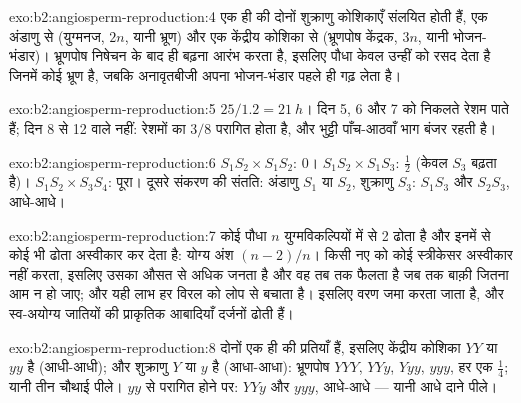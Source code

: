 \begin{solution}{exo:b2:angiosperm-reproduction:4}
एक ही  की दोनों शुक्राणु कोशिकाएँ संलयित होती हैं, एक
अंडाणु से (युग्मनज, $2n$, यानी भ्रूण) और एक केंद्रीय कोशिका से (भ्रूणपोष
केंद्रक, $3n$, यानी भोजन-भंडार)। भ्रूणपोष निषेचन के बाद ही बढ़ना आरंभ
करता है, इसलिए पौधा केवल उन्हीं  को रसद देता है जिनमें कोई
भ्रूण है, जबकि अनावृतबीजी अपना भोजन-भंडार पहले ही गढ़ लेता है।
\end{solution}

\begin{solution}{exo:b2:angiosperm-reproduction:5}
$25/1.2 = \qty{21}{h}$। दिन 5, 6 और 7 को निकलते रेशम  पाते हैं;
दिन 8 से 12 वाले नहीं: रेशमों का $3/8$ परागित होता है, और
भुट्टी पाँच-आठवाँ भाग बंजर रहती है।
\end{solution}

\begin{solution}{exo:b2:angiosperm-reproduction:6}
$S_1S_2\times S_1S_2$: 0। $S_1S_2\times S_1S_3$: $\tfrac12$ (केवल $S_3$
 बढ़ता है)। $S_1S_2\times S_3S_4$: पूरा। दूसरे संकरण की संतति:
अंडाणु $S_1$ या $S_2$, शुक्राणु $S_3$: $S_1S_3$ और $S_2S_3$, आधे-आधे।
\end{solution}

\begin{solution}{exo:b2:angiosperm-reproduction:7}
कोई पौधा $n$ युग्मविकल्पियों में से 2 ढोता है और इनमें से कोई भी ढोता
 अस्वीकार कर देता है: योग्य अंश $(n - 2)/n$। किसी नए  को
कोई स्त्रीकेसर अस्वीकार नहीं करता, इसलिए उसका  औसत से अधिक  जनता
है और वह तब तक फैलता है जब तक बाक़ी जितना आम न हो जाए; और यही लाभ हर
विरल  को लोप से बचाता है। इसलिए वरण  जमा करता
जाता है, और स्व-अयोग्य जातियों की प्राकृतिक आबादियाँ दर्जनों ढोती हैं।
\end{solution}

\begin{solution}{exo:b2:angiosperm-reproduction:8}
दोनों  एक ही  की प्रतियाँ हैं, इसलिए केंद्रीय
कोशिका $YY$ या $yy$ है (आधी-आधी); और शुक्राणु $Y$ या $y$ है (आधा-आधा):
भ्रूणपोष $YYY$, $YYy$, $Yyy$, $yyy$, हर एक $\tfrac14$; यानी तीन
चौथाई पीले। $yy$ से परागित होने पर: $YYy$ और $yyy$, आधे-आधे --- यानी
आधे दाने पीले।
\end{solution}

